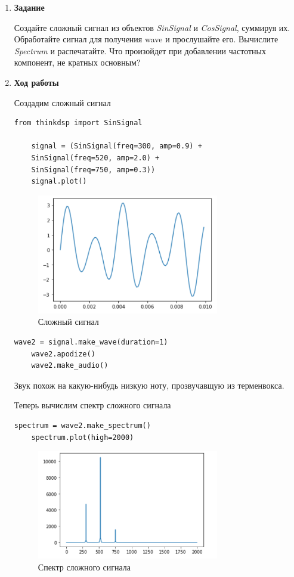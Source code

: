 \documentclass[a4paper,12pt]{article}
\begin{document}
\begin{enumerate}

\item \textbf{Задание}

		Создайте сложный сигнал из объектов \textit{SinSignal} и \textit{CosSignal}, суммируя их. Обработайте сигнал для получения wave и прослушайте его. Вычислите \textit{Spectrum} и распечатайте. Что произойдет при добавлении частотных компонент, не кратных основным?

\item \textbf{Ход работы}

Создадим сложный сигнал
\begin{lstlisting}[caption=Сложный сигнал]
	from thinkdsp import SinSignal
	
	signal = (SinSignal(freq=300, amp=0.9) +
	SinSignal(freq=520, amp=2.0) +
	SinSignal(freq=750, amp=0.3))
	signal.plot()
\end{lstlisting}
\begin{figure}[H]
	\centering
	\includegraphics[width=0.75\textwidth]{3_1.png}
	\caption{Сложный сигнал}
	\label{fig:3.1}
\end{figure}

\begin{lstlisting}[caption=Прослушивание сложного сигнала]
	wave2 = signal.make_wave(duration=1)
	wave2.apodize()
	wave2.make_audio()
\end{lstlisting}

Звук похож на какую-нибудь низкую ноту, прозвучавщую из терменвокса.

Теперь вычислим спектр сложного сигнала
\begin{lstlisting}[caption=Спектр сложного сигнала]
	spectrum = wave2.make_spectrum()
	spectrum.plot(high=2000)
\end{lstlisting}
\begin{figure}[H]
	\centering
	\includegraphics[width=0.75\textwidth]{3_2.png}
	\caption{Спектр сложного сигнала}
	\label{fig:3.2}
\end{figure}


\end{enumerate}
\end{document}
